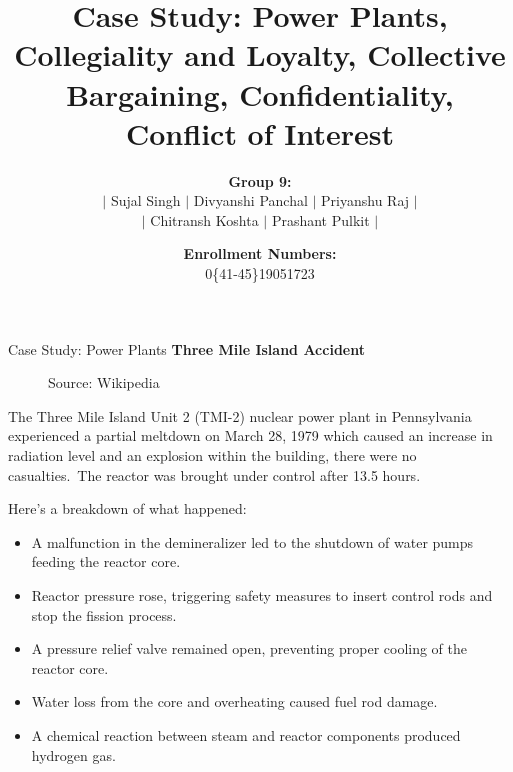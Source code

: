 \documentclass[11pt]{beamer}
\title[Power Plants, Collegiality and Loyalty, \ldots]{%
    \large Case Study: Power Plants, Collegiality and Loyalty, Collective Bargaining, Confidentiality,
    Conflict of Interest
}
\author[Sujal, Divyanshi, Priyanshu \ldots]{%
    \textbf{Group 9:}\\%
    \(|\) Sujal Singh \(|\) Divyanshi Panchal \(|\) Priyanshu Raj \(|\)\\\(|\) Chitransh Koshta \(|\) Prashant
    Pulkit \(|\)%
    \vspace*{-15pt}
}
\date[Chitransh, Prashant]{\textbf{Enrollment Numbers:}\\0\{41-45\}19051723}
\begin{document}
    \maketitle

    \begin{frame}[t,allowframebreaks]{Case Study: Power Plants}
        \textbf{Three Mile Island Accident}\\[10pt]
        \begin{minipage}[t]{0.41\textwidth}
            \vspace*{-8pt}
            \begin{figure}
                \label{fig:three-mile-island}
                {\tiny Source: Wikipedia}
            \end{figure}
        \end{minipage}
        \begin{minipage}[t]{0.58\textwidth}%
            The Three Mile Island Unit 2 (TMI-2) nuclear power plant in Pennsylvania experienced a partial meltdown on
            March 28, 1979 which caused an \alert{increase in radiation level and an explosion within the building},
            there were no casualties.\ The reactor was brought under control after 13.5 hours.
        \end{minipage}

        \framebreak
        Here's a breakdown of what happened:\\[10pt]
        \begin{itemize}
            \small
            \item A malfunction in the demineralizer led to the shutdown of water pumps feeding the reactor core.
            \item Reactor pressure rose, triggering safety measures to insert control rods and stop the fission process.
            \item A pressure relief valve remained open, preventing proper cooling of the reactor core.
            \item Water loss from the core and overheating caused fuel rod damage.
            \item A chemical reaction between steam and reactor components produced hydrogen gas.
        \end{itemize}


\end{frame}
\end{document}
